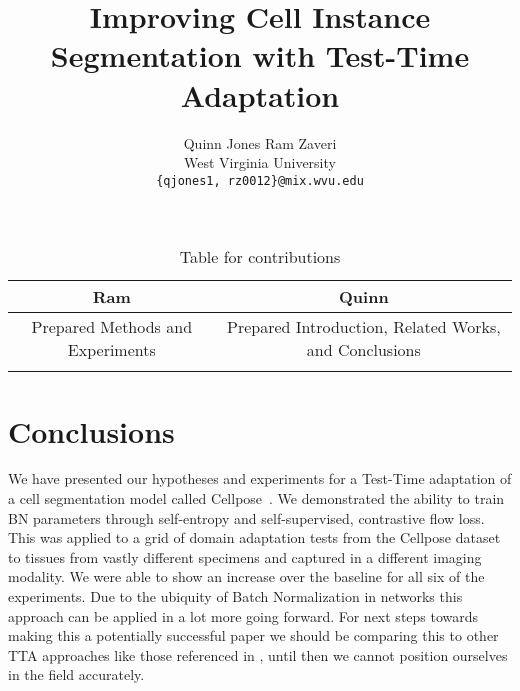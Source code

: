 \documentclass[10pt,twocolumn,letterpaper]{article}
\author{Quinn Jones \qquad Ram Zaveri \\
West Virginia University\\
{\tt\small \{qjones1, rz0012\}@mix.wvu.edu}
}
\begin{document}
\begin{table}[h]
\centering
\begin{tabular}{|c|c|}
\hline
\textbf{Ram} & \textbf{Quinn} \\ \hline
 Prepared Methods and Experiments   & 
 Prepared Introduction, Related Works, and Conclusions
\\ \hline
 &   \\
 \hline
\end{tabular}
\caption{Table for contributions}
\label{tab:ram_quinn}
\end{table}


\pagebreak\pagebreak
\title{Improving Cell Instance Segmentation with Test-Time Adaptation}
\maketitle
    





\section{Conclusions}
We have presented our hypotheses and experiments for a Test-Time adaptation of a cell segmentation model called Cellpose~\cite{stringer2021cellpose}. We demonstrated the ability to train BN parameters through self-entropy and self-supervised, contrastive flow loss.  This was applied to a grid of domain adaptation tests from the Cellpose dataset to tissues from vastly different specimens and captured in a different imaging modality. We were able to show an increase over the baseline for all six of the experiments.   Due to the ubiquity of Batch Normalization in networks this approach can be applied in a lot more going forward.  For next steps towards making this a potentially successful paper we should be comparing this to other TTA approaches like those referenced in , until then we cannot position ourselves in the field accurately. 


{
    \small
    
    
}

% 
\end{document}
